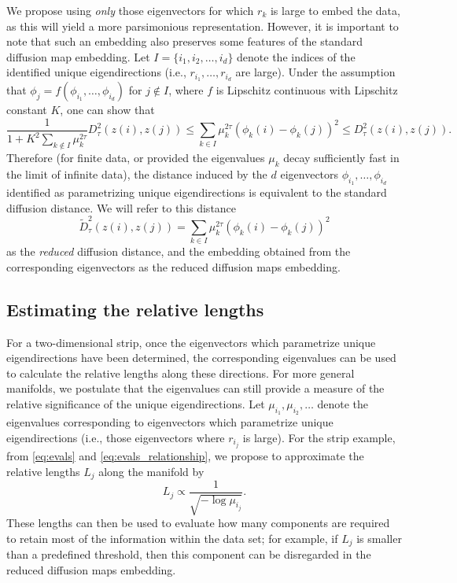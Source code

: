 \documentclass[3p]{elsarticle}
\begin{document}
We propose using {\em only} those eigenvectors for which $r_k$ is large to embed the data,
as this will yield a more parsimonious representation.
%
However, it is important to note that such an embedding also preserves some features of the standard diffusion map embedding.
%
Let $I = \{i_1, i_2, \dots, i_d \}$ denote the indices of the identified unique eigendirections (i.e., $r_{i_1}, \dots, r_{i_d}$ are large).
%
Under the assumption that $\phi_j = f \left( \phi_{i_1}, \dots, \phi_{i_d} \right)$ for $j \not\in I$, where $f$ is Lipschitz continuous with Lipschitz constant $K$, one can show that
\begin{equation}
\frac{1}{1+K^2 \sum_{k \not\in I} \mu_k^{2\tau}} D^2_\tau(z(i), z(j)) \le \sum_{k \in I} \mu_k^{2 \tau} \left( \phi_k(i) - \phi_k(j)  \right)^2 \le D^2_\tau(z(i), z(j)).
\end{equation}
%
Therefore (for finite data, or provided the eigenvalues $\mu_k$ decay sufficiently fast in the limit of infinite data),
the distance induced by the $d$ eigenvectors $\phi_{i_1}, \dots, \phi_{i_d}$ identified as
parametrizing unique eigendirections is equivalent to the standard diffusion distance.
%
We will refer to this distance
\begin{equation}
\tilde{D}^2_\tau(z(i), z(j)) = \sum_{k \in I} \mu_k^{2 \tau} \left( \phi_k(i) - \phi_k(j)  \right)^2
\end{equation}
%
as the {\em reduced} diffusion distance,
and the embedding obtained from the corresponding eigenvectors as the reduced diffusion maps embedding.
%

\subsection{Estimating the relative lengths} \label{sec:relative_lengths}

For a two-dimensional strip, once the eigenvectors which parametrize unique eigendirections have been determined,
the corresponding eigenvalues can be used to calculate the relative lengths along these directions.
%
For more general manifolds, we postulate that the eigenvalues can still provide a measure of the relative
significance of the unique eigendirections.
%
Let $\mu_{i_1}, \mu_{i_2}, \dots$ denote the eigenvalues corresponding to
eigenvectors which parametrize unique eigendirections (i.e., those eigenvectors where $r_{i_j}$ is large).
%
For the strip example, from \eqref{eq:evals} and \eqref{eq:evals_relationship}, we propose to approximate the relative lengths $L_j$  along the manifold by
\begin{equation} \label{eq:est_lengths}
L_j \propto \frac{1}{\sqrt{-\log \mu_{i_j}}}.
\end{equation}
%
These lengths can then be used to evaluate how many components are required to retain
most of the information within the data set;
for example, if $L_j$ is smaller than a predefined threshold, then this component can be disregarded in the reduced diffusion maps embedding.
\end{document}
